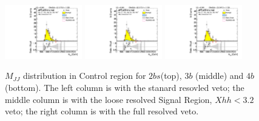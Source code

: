 \begin{figure}[htbp!]
\begin{center}
\includegraphics[width=0.3\textwidth,angle=-90]{figures/boosted/AppendixResveto/Moriond_FourTag_Control_mHH_l.pdf}
\includegraphics[width=0.3\textwidth,angle=-90]{figures/boosted/AppendixResveto/Moriond_resveto_FourTag_Control_mHH_l.pdf}
\includegraphics[width=0.3\textwidth,angle=-90]{figures/boosted/AppendixResveto/Moriond_fullresveto_FourTag_Control_mHH_l.pdf}\\
  \caption{ $M_{JJ}$ distribution in Control region for $2bs$(top), $3b$ (middle) and $4b$ (bottom). The left column is with the stanard resovled veto; the middle column is with the loose resolved Signal Region, $Xhh < 3.2$ veto; the right column is with the full resolved veto.}
\label{fig:app-resveto-cr}
\end{center}
\end{figure}



